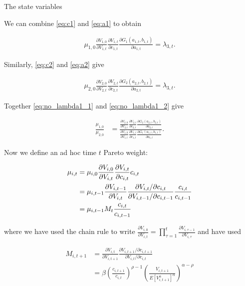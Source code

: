 \documentclass[10pt]{article}
\newcommand{\fracpd}[2]{
  \ensuremath{\frac{\partial #1}{\partial #2}}
}
\begin{document}
The state variables

We can combine \eqref{eq:c1} and \eqref{eq:a1} to obtain

\begin{align} \label{eq:no_lambda1_1}
  \mu_{1,0} \fracpd{V_{1,0}}{V_{1,t}} \fracpd{V_{1,t}}{c_{1,t}} \fracpd{G_1(a_{1,t}, b_{1,t})}{a_{1,t}} = \lambda_{3,t}.
\end{align}

Similarly, \eqref{eq:c2} and \eqref{eq:a2} give

\begin{align} \label{eq:no_lambda1_2}
  \mu_{2,0} \fracpd{V_{2,0}}{V_{2,t}} \fracpd{V_{2,t}}{c_{2,t}} \fracpd{G_2(a_{2,t}, b_{2,t})}{a_{2,t}} = \lambda_{3,t}.
\end{align}

Together \eqref{eq:no_lambda1_1} and \eqref{eq:no_lambda1_2} give

\begin{align} \label{eq:mu0_ratio}
  \frac{\mu_{1,0}}{\mu_{2,0}} &= \frac{\fracpd{V_{2,0}}{V_{2,t}} \fracpd{V_{2,t}}{c_{2,t}} \fracpd{G_2(a_{2,t}, b_{2,t})}{a_{2,t}}}{\fracpd{V_{1,0}}{V_{1,t}} \fracpd{V_{1,t}}{c_{1,t}} \fracpd{G_1(a_{1,t}, b_{1,t})}{a_{1,t}}}.
\end{align}

Now we define an ad hoc time $t$ Pareto weight:

\begin{align} \label{eq:mu_t}
  \mu_{i,t} &= \mu_{i,0} \fracpd{V_{i,0}}{V_{i,t}} \fracpd{V_{i,t}}{c_{i,t}} c_{i,t} \notag \\
  &= \mu_{i,t-1} \fracpd{V_{i,t-1}}{V_{i,t}} \frac{\partial V_{i,t}/ \partial c_{i,t}}{\partial V_{i,t-1}/ \partial c_{i,t-1}} \frac{c_{i,t}}{c_{i,t-1}} \\
  &= \mu_{i,t-1} M_t \frac{c_{i,t}}{c_{i,t-1}}
\end{align}

where we have used the chain rule to write $\fracpd{V_{i,0}}{V_{i,t}} = \prod_{\tau=1}^{t} \fracpd{V_{i,\tau-1}}{V_{i,\tau}}$ and have used

\begin{align} \label{eq:MRS}
  M_{i,t+1} &= \fracpd{V_{i,t}}{V_{i,t+1}} \frac{\partial V_{i,t+1}/ \partial c_{i,t+1}}{\partial V_{i,t}/ \partial c_{i,t}} \\
  &= \beta \left( \frac{c_{i,t+1}}{c_{i,t}}\right)^{\rho - 1} \left( \frac{V_{i,t+1}}{E \left[ V_{i,t+1}^{\alpha} \right]^{\alpha}} \right)^{\alpha - \rho}
\end{align}
\end{document}
